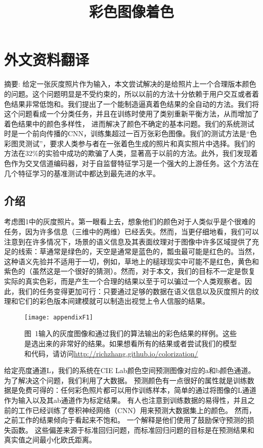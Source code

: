 \chapter{外文资料翻译}
\label{cha:engorg}

\renewcommand\thesection{\arabic {section}}

\title{彩色图像着色}

{\heiti 摘要:} 给定一张灰度照片作为输入，本文尝试解决的是给照片上一个合理版本颜色的问题。这个问题明显是不受约束的，所以以前的方法十分依赖于用户交互或者着色结果非常低饱和。我们提出了一个能制造逼真着色结果的全自动的方法。我们将这个问题看成一个分类任务，并且在训练时使用了类别重新平衡方法，从而增加了着色结果中的颜色多样性， 进而解决了颜色不确定的基本问题。我们的系统测试时是一个前向传播的CNN，训练集超过一百万张彩色图像。我们的测试方法是“色彩图灵测试”，要求人类参与者在一张着色生成的照片和真实照片中选择。我们的方法在32\%的实验中成功的欺骗了人类，显著高于以前的方法。此外，我们发现着色作为交叉信道编码器，对于自监督特征学习是一个强大的上游任务。这个方法在几个特征学习的基准测试中都达到最先进的水平。


\section{介绍}
考虑图1中的灰度照片。第一眼看上去，想象他们的颜色对于人类似乎是个很难的任务，因为许多信息（三维中的两维）已经丢失。然而，当更仔细地看，我们可以注意到在许多情况下，场景的语义信息及其表面纹理对于图像中许多区域提供了充足的线索：草通常是绿色的，天空是通常是蓝色的，瓢虫最可能是红色的。当然，这种语义先验并不适用于一切，例如，草地上的槌球现实中可能不是红色，黄色和紫色的（虽然这是一个很好的猜测）。然而，对于本文，我们的目标不一定是恢复实际的真实色彩，而是产生一个合理的结果以至于可以骗过一个人类观察者。因此，我们的任务变得更加可行：只要通过足够的数据在语义信息以及灰度照片的纹理和它们的彩色版本间建模就可以制造出视觉上令人信服的结果。

\begin{figure}[h]
  \centering
  \texttt{[image: appendixF1]}
  \caption*{图~1\quad 输入的灰度图像和通过我们的算法输出的彩色结果的样例。这些是选出来的非常好的结果。如果想看所有的结果或者尝试我们的模型和代码，请访问\url{http://richzhang.github.io/colorization/}}
  \label{tab:badfigure1}
\end{figure}

给定亮度通道L，我们的系统在CIE Lab颜色空间预测图像对应的a和b颜色通道。为了解决这个问题，我们利用了大数据。 预测颜色有一点很好的属性就是训练数据是免费可得的：任何彩色照片都可以用作训练样本，简单的通过将图像的L通道作为输入以及其ab通道作为标定结果。 有人也注意到训练数据的易得性，并且之前的工作已经训练了卷积神经网络（CNN）用来预测大数据集上的颜色。 然而，之前工作的结果倾向于看起来不饱和。 一个解释是他们使用了鼓励保守预测的损失函数。 这些偏差来源于标准回归问题，而标准回归问题的目标是在预测结果和真实值之间最小化欧氏距离。

